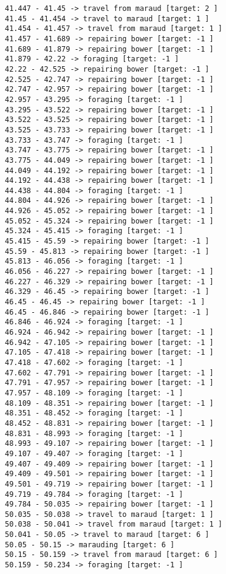 \documentclass[11pt]{article}
\begin{document}
\begin{Verbatim}[commandchars=\\\{\}]
41.447 - 41.45 -> travel from maraud [target: 2 ]
41.45 - 41.454 -> travel to maraud [target: 1 ]
41.454 - 41.457 -> travel from maraud [target: 1 ]
41.457 - 41.689 -> repairing bower [target: -1 ]
41.689 - 41.879 -> repairing bower [target: -1 ]
41.879 - 42.22 -> foraging [target: -1 ]
42.22 - 42.525 -> repairing bower [target: -1 ]
42.525 - 42.747 -> repairing bower [target: -1 ]
42.747 - 42.957 -> repairing bower [target: -1 ]
42.957 - 43.295 -> foraging [target: -1 ]
43.295 - 43.522 -> repairing bower [target: -1 ]
43.522 - 43.525 -> repairing bower [target: -1 ]
43.525 - 43.733 -> repairing bower [target: -1 ]
43.733 - 43.747 -> foraging [target: -1 ]
43.747 - 43.775 -> repairing bower [target: -1 ]
43.775 - 44.049 -> repairing bower [target: -1 ]
44.049 - 44.192 -> repairing bower [target: -1 ]
44.192 - 44.438 -> repairing bower [target: -1 ]
44.438 - 44.804 -> foraging [target: -1 ]
44.804 - 44.926 -> repairing bower [target: -1 ]
44.926 - 45.052 -> repairing bower [target: -1 ]
45.052 - 45.324 -> repairing bower [target: -1 ]
45.324 - 45.415 -> foraging [target: -1 ]
45.415 - 45.59 -> repairing bower [target: -1 ]
45.59 - 45.813 -> repairing bower [target: -1 ]
45.813 - 46.056 -> foraging [target: -1 ]
46.056 - 46.227 -> repairing bower [target: -1 ]
46.227 - 46.329 -> repairing bower [target: -1 ]
46.329 - 46.45 -> repairing bower [target: -1 ]
46.45 - 46.45 -> repairing bower [target: -1 ]
46.45 - 46.846 -> repairing bower [target: -1 ]
46.846 - 46.924 -> foraging [target: -1 ]
46.924 - 46.942 -> repairing bower [target: -1 ]
46.942 - 47.105 -> repairing bower [target: -1 ]
47.105 - 47.418 -> repairing bower [target: -1 ]
47.418 - 47.602 -> foraging [target: -1 ]
47.602 - 47.791 -> repairing bower [target: -1 ]
47.791 - 47.957 -> repairing bower [target: -1 ]
47.957 - 48.109 -> foraging [target: -1 ]
48.109 - 48.351 -> repairing bower [target: -1 ]
48.351 - 48.452 -> foraging [target: -1 ]
48.452 - 48.831 -> repairing bower [target: -1 ]
48.831 - 48.993 -> foraging [target: -1 ]
48.993 - 49.107 -> repairing bower [target: -1 ]
49.107 - 49.407 -> foraging [target: -1 ]
49.407 - 49.409 -> repairing bower [target: -1 ]
49.409 - 49.501 -> repairing bower [target: -1 ]
49.501 - 49.719 -> repairing bower [target: -1 ]
49.719 - 49.784 -> foraging [target: -1 ]
49.784 - 50.035 -> repairing bower [target: -1 ]
50.035 - 50.038 -> travel to maraud [target: 1 ]
50.038 - 50.041 -> travel from maraud [target: 1 ]
50.041 - 50.05 -> travel to maraud [target: 6 ]
50.05 - 50.15 -> marauding [target: 6 ]
50.15 - 50.159 -> travel from maraud [target: 6 ]
50.159 - 50.234 -> foraging [target: -1 ]

\end{Verbatim}
\end{document}
